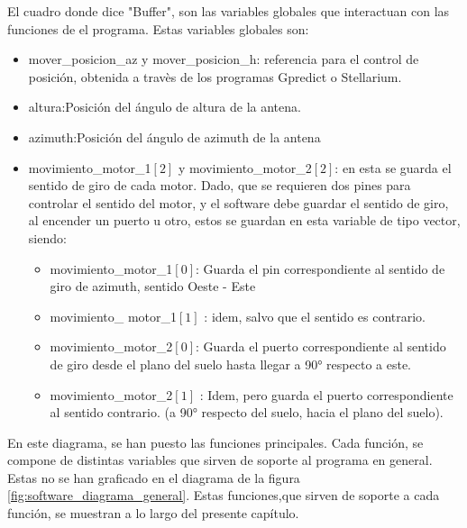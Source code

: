 El cuadro donde dice "Buffer", son las variables globales que interactuan con las funciones de el programa. Estas variables globales son: 
\begin{itemize}
	\item mover\_posicion\_az y mover\_posicion\_h: referencia para el control de posición, obtenida a travès de los programas Gpredict o Stellarium.  
	\item altura:Posición del ángulo de altura de la antena. 
	\item azimuth:Posición del ángulo de azimuth de la antena
	\item movimiento\_motor\_1$[2]$  y movimiento\_motor\_2$[2]$: en esta se guarda el sentido de giro de cada motor. Dado, que se requieren dos pines para controlar el sentido del motor, y el software debe guardar el sentido de giro, al encender un puerto u otro, estos se guardan en esta variable de tipo vector, siendo: 
		\begin{itemize}
			\item movimiento\_motor\_1$[0]$: Guarda el pin correspondiente al sentido de giro de azimuth, sentido Oeste - Este 
			\item movimiento\_ motor\_1$[1]$ : idem, salvo que el sentido es contrario.  
			\item movimiento\_motor\_2$[0]$: Guarda el puerto correspondiente al sentido de giro desde el plano del suelo hasta llegar a 90° respecto a este. 
			\item movimiento\_motor\_2$[1]$ : Idem, pero guarda el puerto correspondiente al sentido contrario. (a 90° respecto del suelo, hacia el plano del suelo). 			
		\end{itemize}
	
\end{itemize}  



En este diagrama, se han puesto las funciones principales. Cada función, se compone de distintas variables que sirven de soporte al programa en general. Estas no se han graficado en el diagrama de la figura \ref{fig:software_diagrama_general}. Estas funciones,que sirven de soporte a cada función, se muestran a lo largo del presente capítulo. 


%

